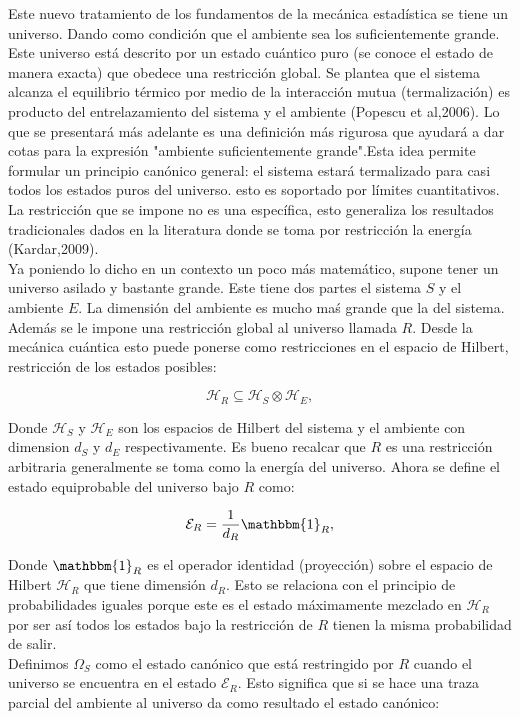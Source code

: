 Este nuevo tratamiento de los fundamentos de la mecánica estadística se tiene un universo. Dando como condición que el ambiente sea los suficientemente grande. Este universo está descrito por un estado cuántico puro (se conoce el estado de manera exacta) que obedece una restricción global. Se plantea que el sistema alcanza el equilibrio térmico por medio de la interacción mutua (termalización) es producto del entrelazamiento del sistema y el ambiente (Popescu et al,2006). Lo que se presentará más adelante es una definición más rigurosa que ayudará a dar cotas para la expresión "ambiente suficientemente grande".Esta idea permite formular un principio canónico general: el sistema estará termalizado para casi todos los estados puros del universo. esto es soportado por límites cuantitativos. La restricción que se impone no es una específica, esto generaliza los resultados tradicionales dados en la literatura donde se toma por restricción la energía (Kardar,2009).
\\
Ya poniendo lo dicho en un contexto un poco más matemático, supone tener un universo asilado y bastante grande. Este tiene dos partes el sistema $S$ y el ambiente $E$. La dimensión del ambiente es mucho maś grande que la del sistema. Además se le impone una restricción global al universo llamada $R$. Desde la mecánica cuántica esto puede ponerse como restricciones en el espacio de Hilbert, restricción de los estados posibles:

\begin{equation}
\mathcal{H}_{R}\subseteq \mathcal{H}_{S}\otimes \mathcal{H}_{E},
\end{equation}

Donde $\mathcal{H}_{S}$ y $\mathcal{H}_{E}$ son los espacios de Hilbert del sistema y el ambiente con dimension $d_{S}$  y $d_{E}$ respectivamente. Es bueno recalcar que $R$ es una restricción arbitraria generalmente se toma como la energía del universo. Ahora se define el estado equiprobable del universo bajo $R$ como:

\begin{equation}
\mathcal{E}_{R} = \frac{1}{d_{R}} \mathbbm{1}_{R},
\end{equation}

Donde $\mathbbm{1}_{R}$ es el operador identidad (proyección) sobre el espacio de Hilbert  $\mathcal{H}_{R}$  que tiene dimensión $d_{R}$. Esto se relaciona con el principio de probabilidades iguales porque este es el estado máximamente mezclado en $\mathcal{H}_{R}$ por ser así todos los estados bajo la restricción de $R$ tienen la misma probabilidad de salir.
\\
Definimos $\Omega_{S}$ como el estado canónico que está restringido por $R$ cuando el universo se encuentra en el estado $\mathcal{E}_{R}$. Esto significa que si se hace una traza parcial del ambiente al universo da como resultado el estado canónico:

